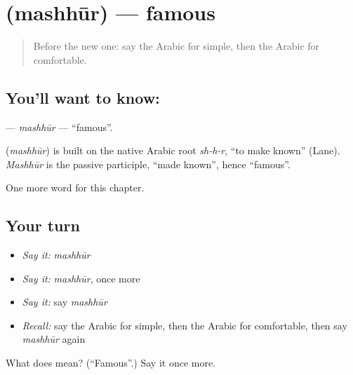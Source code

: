 \section[\texorpdfstring{\ar{مشهور} (mashhūr)}{مشهور (mashhūr)}]{ (mashhūr) — famous}

\label{lesson:AR-C145-mashhur}



\begin{quote}
Before the new one: say the Arabic for simple, then the Arabic for comfortable.
\end{quote}

\subsection*{You'll want to know: }
\textbf{} — \emph{mashhūr} — \textquotedblleft{}famous\textquotedblright{}.

\begin{cousinweb}
\textbf{} (\emph{mashhūr}) is built on the native Arabic root \emph{sh-h-r}, \textquotedblleft{}to make known\textquotedblright{} (Lane). \emph{Mashhūr} is the passive participle, \textquotedblleft{}made known\textquotedblright{}, hence \textquotedblleft{}famous\textquotedblright{}.
\end{cousinweb}

\begin{grammarlens}[title={What you've built}]
One more word for this chapter.
\end{grammarlens}

\subsection*{Your turn}
\begin{itemize}
\raggedright
  \item \emph{Say it:} \emph{mashhūr}
  \item \emph{Say it:} \emph{mashhūr}, once more
  \item \emph{Say it:} say \emph{mashhūr}
  \item \emph{Recall:} say the Arabic for simple, then the Arabic for comfortable, then say \emph{mashhūr} again
\end{itemize}

\begin{tcolorbox}[breakable,colback=teal!4,colframe=teal!35!black,title={Before you move on}]
What does  mean? (\textquotedblleft{}Famous\textquotedblright{}.) Say it once more.
\end{tcolorbox}
